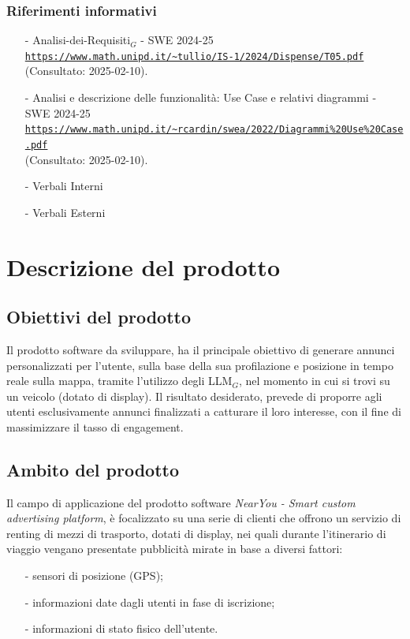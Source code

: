 \documentclass[10pt]{article}
\begin{document}
\begin{justify}
\begin{itemize}
\end{itemize}
\subsubsection{Riferimenti informativi}
\begin{itemize}
    \item[-] Analisi-dei-Requisiti$_G$ - SWE 2024-25\\
    \textcolor{blue}{\texttt{\url{https://www.math.unipd.it/~tullio/IS-1/2024/Dispense/T05.pdf}}}\\ (Consultato: 2025-02-10).
    \item[-] Analisi e descrizione delle funzionalità: Use Case e relativi diagrammi - SWE 2024-25\\    
    \textcolor{blue}{\texttt{\url{https://www.math.unipd.it/~rcardin/swea/2022/Diagrammi\%20Use\%20Case.pdf}}}\\ (Consultato: 2025-02-10).
    \item[-] Verbali Interni
    \item[-] Verbali Esterni
    
\end{itemize}

\newpage
\section{Descrizione del prodotto}
\label{sec:descrizione}
\subsection{Obiettivi del prodotto}
Il prodotto software da sviluppare, ha il principale obiettivo di generare annunci personalizzati per l'utente, sulla base della sua profilazione e posizione in tempo reale sulla mappa, tramite l'utilizzo degli LLM$_G$, nel momento in cui si trovi su un veicolo (dotato di display). Il risultato desiderato, prevede di proporre agli utenti esclusivamente annunci finalizzati a catturare il loro interesse, con il fine di massimizzare il tasso di engagement.

\subsection{Ambito del prodotto}
Il campo di applicazione del prodotto software \textit{NearYou - 
Smart custom advertising platform}, è focalizzato su una serie di clienti che offrono un servizio di renting di mezzi di trasporto, dotati di display, nei quali durante l'itinerario di viaggio vengano presentate pubblicità mirate in base a diversi fattori:
\begin{itemize}
    \item [-] sensori di posizione (GPS);
    \item [-] informazioni date dagli utenti in fase di iscrizione;
    \item [-] informazioni di stato fisico dell’utente.
\end{itemize}


\end{justify}
\end{document}
